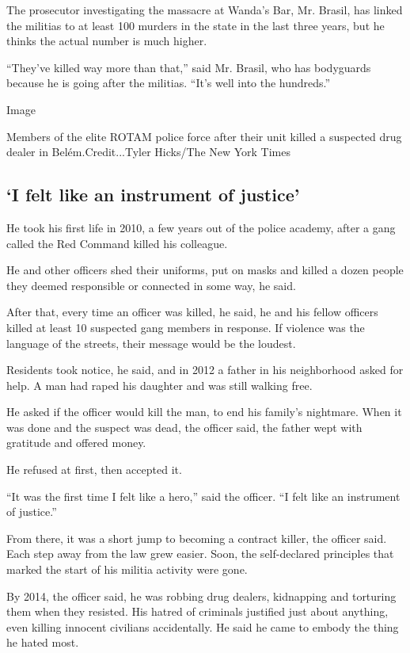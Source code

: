 The prosecutor investigating the massacre at Wanda's Bar, Mr. Brasil,
has linked the militias to at least 100 murders in the state in the last
three years, but he thinks the actual number is much higher.

``They've killed way more than that,'' said Mr. Brasil, who has
bodyguards because he is going after the militias. ``It's well into the
hundreds.''

Image

Members of the elite ROTAM police force after their unit killed a
suspected drug dealer in Belém.Credit...Tyler Hicks/The New York Times

\hypertarget{i-felt-like-an-instrument-of-justice}{%
\subsection{`I felt like an instrument of
justice'}\label{i-felt-like-an-instrument-of-justice}}

He took his first life in 2010, a few years out of the police academy,
after a gang called the Red Command killed his colleague.

He and other officers shed their uniforms, put on masks and killed a
dozen people they deemed responsible or connected in some way, he said.

After that, every time an officer was killed, he said, he and his fellow
officers killed at least 10 suspected gang members in response. If
violence was the language of the streets, their message would be the
loudest.

Residents took notice, he said, and in 2012 a father in his neighborhood
asked for help. A man had raped his daughter and was still walking free.

He asked if the officer would kill the man, to end his family's
nightmare. When it was done and the suspect was dead, the officer said,
the father wept with gratitude and offered money.

He refused at first, then accepted it.

``It was the first time I felt like a hero,'' said the officer. ``I felt
like an instrument of justice.''

From there, it was a short jump to becoming a contract killer, the
officer said. Each step away from the law grew easier. Soon, the
self-declared principles that marked the start of his militia activity
were gone.

By 2014, the officer said, he was robbing drug dealers, kidnapping and
torturing them when they resisted. His hatred of criminals justified
just about anything, even killing innocent civilians accidentally. He
said he came to embody the thing he hated most.

